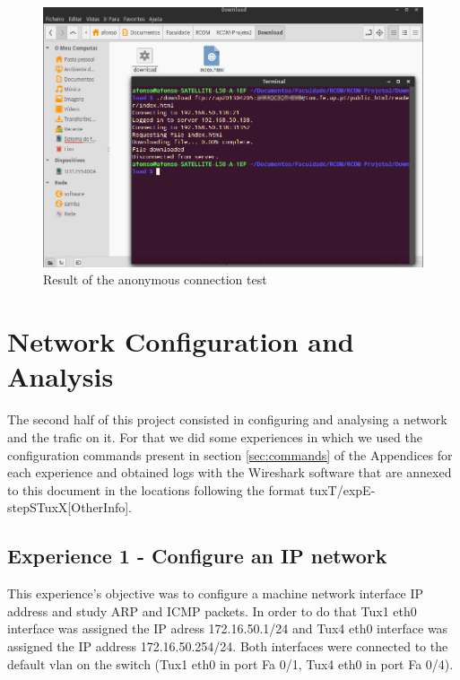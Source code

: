 \documentclass[11pt,a4paper,reqno]{article}
\numberwithin{equation}{section}
\begin{document}
\begin{figure}[p]
\centering
\includegraphics[scale=0.5]{anontest.png}
\caption{Result of the anonymous connection test}
\label{fig:anonconnection}
\end{figure}

\section{Network Configuration and Analysis}

The second half of this project consisted in configuring and analysing a network and the trafic on it. For that we did some experiences in which we
used the configuration commands present in section \ref{sec:commands} of the Appendices for each experience and obtained logs with the Wireshark software that are annexed to this document
in the locations following the format tuxT/expE-stepSTuxX[OtherInfo].

\subsection{Experience 1 - Configure an IP network}

This experience’s objective was to configure a machine network interface IP address and study ARP and ICMP packets. In order to do that Tux1 eth0 interface was assigned the IP adress 172.16.50.1/24 and Tux4 eth0 interface was assigned the IP address 172.16.50.254/24. Both interfaces were connected to the default vlan on the switch (Tux1 eth0 in port Fa 0/1, Tux4 eth0 in port Fa 0/4).
\end{document}
